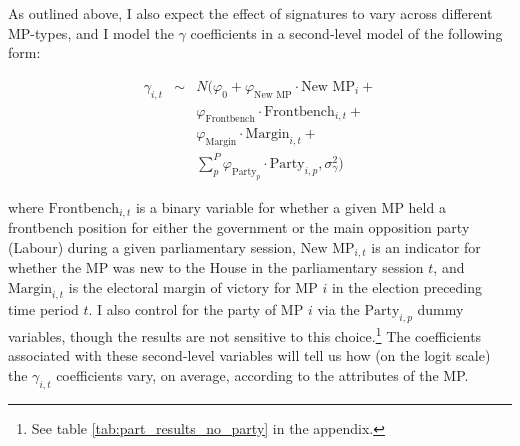 \documentclass[12pt]{article}
\begin{document}
As outlined above, I also expect the effect of signatures to vary across different MP-types, and I model the $\gamma$ coefficients in a second-level model of the following form:

\vspace{-0.5cm}
\begin{eqnarray}\label{eq:gamma_priors}
\gamma_{i,t} &\sim& N(\varphi_{0} + \varphi_{\text{New MP}} \cdot \text{New MP}_i + \nonumber \\
&& \varphi_{\text{Frontbench}} \cdot \text{Frontbench}_{i,t} + \nonumber \\ 
&& \varphi_{\text{Margin}} \cdot \text{Margin}_{i,t} + \nonumber \\
&& \sum_p^P\varphi_{\text{Party}_p} \cdot \text{Party}_{i,p}, 
\sigma_{\gamma}^2)
\end{eqnarray}

\noindent where $\text{Frontbench}_{i,t}$ is a binary variable for whether a given MP held a frontbench position for either the government or the main opposition party (Labour) during a given parliamentary session, $\text{New MP}_{i,t}$ is an indicator for whether the MP was new to the House in the parliamentary session $t$, and $\text{Margin}_{i,t}$ is the electoral margin of victory for MP $i$ in the election preceding time period $t$. I also control for the party of MP $i$ via the $\text{Party}_{i,p}$ dummy variables, though the results are not sensitive to this choice.\footnote{See table \ref{tab:part_results_no_party} in the appendix.} The coefficients associated with these second-level variables will tell us how (on the logit scale) the $\gamma_{i,t}$ coefficients vary, on average, according to the attributes of the MP. 
\end{document}
